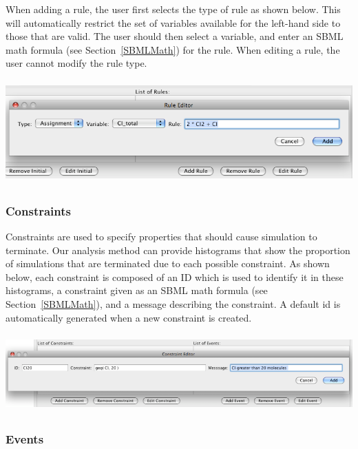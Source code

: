 \documentclass[titlepage,11pt]{article}
\begin{document}
When adding a rule, the user first selects the type of rule as shown
below.  This
will automatically restrict the set of variables available for the 
left-hand side to those that are valid.  The user should then select
a variable, and enter an SBML math formula (see Section~\ref{SBMLMath})
for the rule.  When editing a rule, the user cannot modify the rule type. 
\begin{center}
\includegraphics[height=40mm]{screenshots/rule}
\end{center}

\subsubsection{\label{constraints}Constraints}

\noindent
Constraints are used to specify properties that should cause
simulation to terminate.  Our analysis method can provide histograms 
that show the proportion of simulations that are terminated due to each
possible constraint.  As shown below, 
each constraint is composed of an ID which is
used to identify it in these histograms, a constraint given as an 
SBML math formula (see Section~\ref{SBMLMath}), and a message 
describing the constraint.  A default id is automatically generated 
when a new constraint is created.
\begin{center}
\includegraphics[height=30mm]{screenshots/constraint}
\end{center}

\subsubsection{\label{events}Events}
\end{document}

